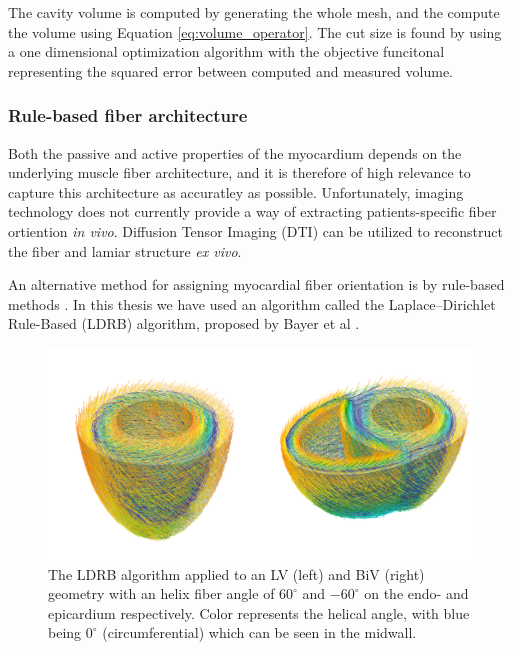 \begin{remark}
  The cavity volume is computed by generating the whole mesh, and the
  compute the volume using Equation \eqref{eq:volume_operator}. The cut size is
  found by using a one dimensional optimization algorithm with
  the objective funcitonal representing the squared error between
  computed and measured volume.
\end{remark}




\subsubsection{Rule-based fiber architecture}
\label{sec:rule_based_fiber}
Both the passive and active properties of the myocardium depends on
the underlying muscle fiber architecture, and it is therefore of high
relevance to capture this architecture as accuratley as
possible. Unfortunately, imaging technology does not currently provide a
way of extracting patients-specific fiber ortiention \emph{in
  vivo}. Diffusion Tensor Imaging (DTI) can be utilized to reconstruct
the fiber and lamiar structure \cite{rohmer2007reconstruction}
\emph{ex vivo}.

An alternative method for assigning myocardial fiber orientation is by
rule-based methods \cite{potse2006comparison, bayer2012novel}. 
In this thesis we have used an algorithm called the Laplace–Dirichlet
Rule-Based (LDRB) algorithm, proposed by Bayer et al \cite{bayer2012novel}.


\begin{figure}[htbp]
  \centering
  \includegraphics[width=\textwidth]
  {chapters/introduction/figures/fiber/fiber}
\caption{The LDRB algorithm \cite{bayer2012novel} applied to an LV
  (left) and BiV (right) geometry with an helix fiber angle of
  $60^{\circ}$ and $-60^{\circ}$ on the endo- and epicardium
  respectively. Color represents the helical angle, with blue being
  $0^{\circ}$ (circumferential) which can be seen in the midwall. }
\label{fig:echopac_output}
\end{figure}


